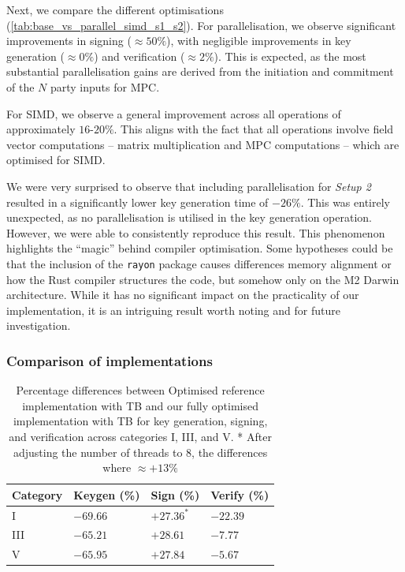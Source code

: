 \documentclass[11pt]{report}
\theoremstyle{definition}
\theoremstyle{plain}
\begin{document}
Next, we compare the different optimisations (\autoref{tab:base_vs_parallel_simd_s1_s2}). For parallelisation, we observe significant improvements in signing ($\approx 50\%$), with negligible improvements in key generation ($\approx 0\%$) and verification ($\approx 2\%$). This is expected, as the most substantial parallelisation gains are derived from the initiation and commitment of the $N$ party inputs for MPC.

For SIMD, we observe a general improvement across all operations of approximately $16$-$20\%$. This aligns with the fact that all operations involve field vector computations -- matrix multiplication and MPC computations -- which are optimised for SIMD.

We were very surprised to observe that including parallelisation for \textit{Setup 2} resulted in a significantly lower key generation time of $-26\%$. This was entirely unexpected, as no parallelisation is utilised in the key generation operation. However, we were able to consistently reproduce this result. This phenomenon highlights the ``magic'' behind compiler optimisation. Some hypotheses could be that the inclusion of the \texttt{rayon} package causes differences memory alignment or how the Rust compiler structures the code, but somehow only on the M2 Darwin architecture. While it has no significant impact on the practicality of our implementation, it is an intriguing result worth noting and for future investigation.

\subsubsection{Comparison of implementations}\label{sub:comparison_implementations}

\begin{table}[H]
  \centering
  \begin{tabular}{l|lll}
    \hline
    Category & Keygen (\%) & Sign (\%)  & Verify (\%) \\
    \hline
    I        & $-69.66$    & $+27.36^*$ & $-22.39$    \\
    III      & $-65.21$    & $+28.61$   & $-7.77$     \\
    V        & $-65.95$    & $+27.84$   & $-5.67$     \\
    \hline
  \end{tabular}
  \caption{Percentage differences between Optimised reference implementation with TB and our fully optimised implementation with TB for key generation, signing, and verification across categories I, III, and V. * After adjusting the number of threads to 8, the differences where $\approx +13\%$}
  \label{tab:optimized_vs_simd_parallel_tb_new}
\end{table}
\end{document}
